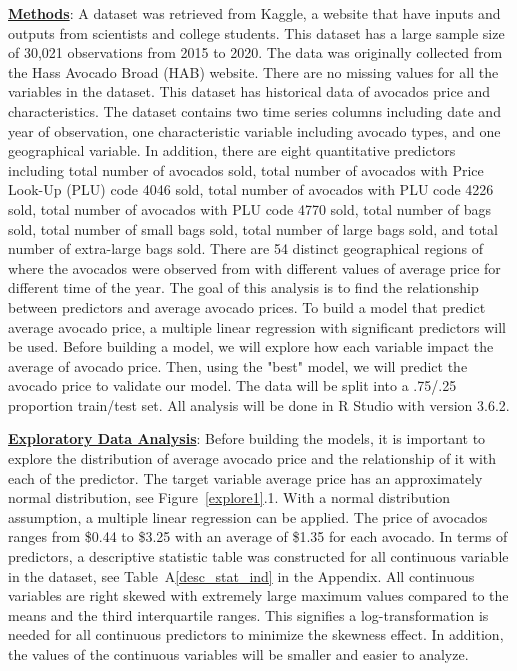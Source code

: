 \documentclass[11pt]{article}\usepackage[]{graphicx}\usepackage[]{color}
\begin{document}
\noindent\textbf{\underline{Methods}}: A dataset was retrieved from Kaggle, a website that have inputs and outputs from scientists and college students. This dataset has a large sample size of 30,021 observations from 2015 to 2020. The data was originally collected from the Hass Avocado Broad (HAB) website. There are no missing values for all the variables in the dataset. This dataset has historical data of avocados price and characteristics. The dataset contains two time series columns including date and year of observation, one characteristic variable including avocado types, and one geographical variable. In addition, there are eight quantitative predictors including total number of avocados sold, total number of avocados with Price Look-Up (PLU) code 4046 sold, total number of avocados with PLU code 4226 sold, total number of avocados with PLU code 4770 sold, total number of bags sold, total number of small bags sold, total number of large bags sold, and total number of extra-large bags sold. There are 54 distinct geographical regions of where the avocados were observed from with different values of average price for different time of the year. The goal of this analysis is to find the relationship between predictors and average avocado prices. To build a model that predict average avocado price, a multiple linear regression with significant predictors will be used. Before building a model, we will explore how each variable impact the average of avocado price. Then, using the "best" model, we will predict the avocado price to validate our model. The data will be split into a .75/.25 proportion train/test set. All analysis will be done in R Studio with version 3.6.2.  
\hfill \break

\noindent\textbf{\underline{Exploratory Data Analysis}}: Before building the models, it is important to explore the distribution of average avocado price and the relationship of it with each of the predictor. The target variable average price has an approximately normal distribution, see Figure~\ref{explore1}.1. With a normal distribution assumption, a multiple linear regression can be applied. The price of avocados ranges from \$0.44 to \$3.25 with an average of \$1.35 for each avocado. In terms of predictors, a descriptive statistic table was constructed for all continuous variable in the dataset, see Table~A\ref{desc_stat_ind} in the Appendix. All continuous variables are right skewed with extremely large maximum values compared to the means and the third interquartile ranges. This signifies a log-transformation is needed for all continuous predictors to minimize the skewness effect. In addition, the values of the continuous variables will be smaller and easier to analyze.      
\end{document}
